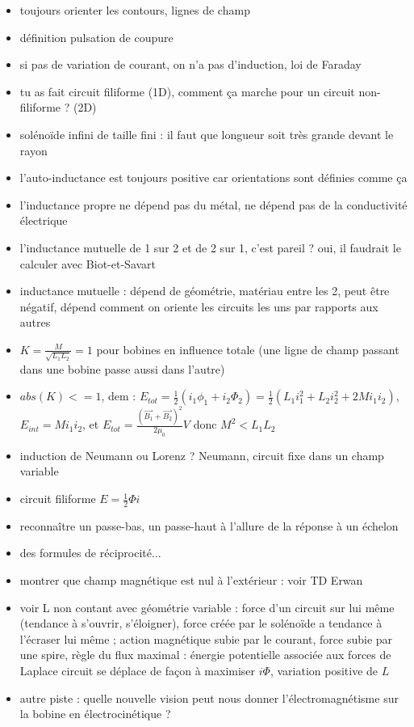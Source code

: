 \begin{remarques} \begin{itemize} 
\item toujours orienter les contours, lignes de champ
\item définition pulsation de coupure
\item si pas de variation de courant, on n'a pas d'induction, loi de Faraday
\item tu as fait circuit filiforme (1D), comment ça marche pour un circuit non-filiforme ? (2D)
\item solénoïde infini de taille fini : il faut que longueur soit très grande devant le rayon
\item l'auto-inductance est toujours positive car orientations sont définies comme ça
\item l'inductance propre ne dépend pas du métal, ne dépend pas de la conductivité électrique
\item l'inductance mutuelle de 1 sur 2 et de 2 sur 1, c'est pareil ?  oui, il faudrait le calculer avec Biot-et-Savart
\item inductance mutuelle : dépend de géométrie, matériau entre les 2, peut être négatif, dépend comment on oriente les circuits les uns par rapports aux autres
\item $K=\frac{M}{\sqrt{L_1 L_2}}=1$ pour bobines en influence totale (une ligne de champ passant dans une bobine passe aussi dans l'autre)
\item $abs(K)<=1$, dem : $E_{tot}=\frac{1}{2} \left( i_1 \phi_1 +i_2 \Phi_2 \right)=\frac{1}{2}\left( L_1 i_1^2  +L_2 i_2^2 + 2M i_1 i_2 \right)$, $E_{int}=M i_1 i_2$, et $E_{tot}=\frac{\left( \vec{B_1} + \vec{B_2}\right)^2}{2\mu_0} V$ donc $M^2<L_1 L_2$
\item induction de Neumann ou Lorenz ? Neumann, circuit fixe dans un champ variable
\item circuit filiforme $E=\frac{1}{2} \Phi i$
\item reconnaître un passe-bas, un passe-haut à l'allure de la réponse à un échelon
\item des formules de réciprocité...
\item montrer que champ magnétique est nul à l'extérieur : voir TD Erwan
\item voir L non contant avec géométrie variable : force d'un circuit sur lui même (tendance à s'ouvrir, s'éloigner), force créée par le solénoïde a tendance à l'écraser lui même ; action magnétique subie par le courant, force subie par une spire, règle du flux maximal : énergie potentielle associée aux forces de Laplace circuit se déplace de façon à maximiser $i \Phi$, variation positive de $L$
\item autre piste : quelle nouvelle vision peut nous donner l'électromagnétisme sur la bobine en électrocinétique ?
\end{itemize} \end{remarques}